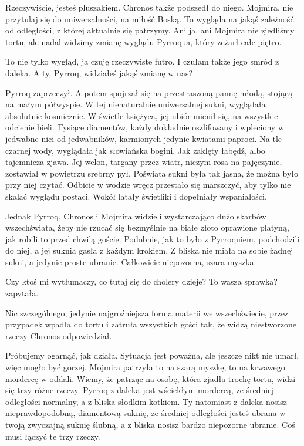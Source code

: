 \ds{} Rzeczywiście, jesteś pluszakiem. \dm{} Chronos także podszedł do niego. \dm{} Mojmira, nie przytulaj się do uniwersalności, na miłość Boską.
To wygląda na jakąś zależność od odległości, z której aktualnie się patrzymy. Ani ja, ani Mojmira nie zjedliśmy tortu, ale nadal widzimy zmianę wyglądu Pyrroqua, który zeżarł całe piętro. \de{}

\ds{} To nie tylko wygląd, ja czuję rzeczywiste futro. I czułam także jego smród z daleka. A ty, Pyrroq, widziałeś jakąś zmianę w nas? \de{}

Pyrroq zaprzeczył. A potem spojrzał się na przestraszoną pannę młodą, stojącą na małym półwyspie.
W tej nienaturalnie uniwersalnej sukni, wyglądała absolutnie kosmicznie.
W świetle księżyca, jej ubiór mienił się, na wszystkie odcienie bieli.
Tysiące diamentów, każdy dokładnie oszlifowany i wpleciony w jedwabne nici od jedwabników, karmionych jedynie kwiatami paproci.
Na tle czarnej wody, wyglądała jak słowiańska bogini. Jak zaklęty łabędź, albo tajemnicza zjawa.
Jej welon, targany przez wiatr, niczym rosa na pajęczynie, zostawiał w powietrzu srebrny pył.
Poświata sukni była tak jasna, że można było przy niej czytać.
Odbicie w wodzie wręcz przestało się marszczyć, aby tylko nie skalać wyglądu postaci.
Wokół latały świetliki i dopełniały wspaniałości.

Jednak Pyrroq, Chronos i Mojmira widzieli wystarczająco dużo skarbów wszechświata, żeby nie rzucać się bezmyślnie na białe złoto oprawione platyną, 
jak robili to przed chwilą goście.
Podobnie, jak to było z Pyrroquiem, podchodzili do niej, a jej suknia gasła z każdym krokiem.
Z bliska nie miała na sobie żadnej sukni, a jedynie proste ubranie. Całkowicie niepozorna, szara myszka.

\ds{} Czy ktoś mi wytłumaczy, co tutaj się do cholery dzieje? To wasza sprawka? \dm{} zapytała. \de{}

\ds{} Nic szczególnego, jedynie najgroźniejsza forma materii we wszechświecie, przez przypadek wpadła do tortu i zatruła wszystkich gości tak, że widzą niestworzone rzeczy \dm{}
Chronos odpowiedział.\de{}

\ds{} Próbujemy ogarnąć, jak działa. Sytuacja jest poważna, ale jeszcze nikt nie umarł, więc mogło być gorzej. \dm{} Mojmira patrzyła to na szarą myszkę, to na krwawego mordercę w oddali. \dm{}
Wiemy, że patrząc na osobę, która zjadła trochę tortu, widzi się trzy różne rzeczy. Pyrroq z daleka jest wściekłym mordercą, ze średniej odległości normalny, a z bliska słodkim kotkiem.
Ty natomiast z daleka nosisz nieprawdopodobną, diamentową suknię, ze średniej odległości jesteś ubrana w twoją zwyczajną suknię ślubną, a z bliska nosisz bardzo niepozorne ubranie.
Coś musi łączyć te trzy rzeczy. \de{}

